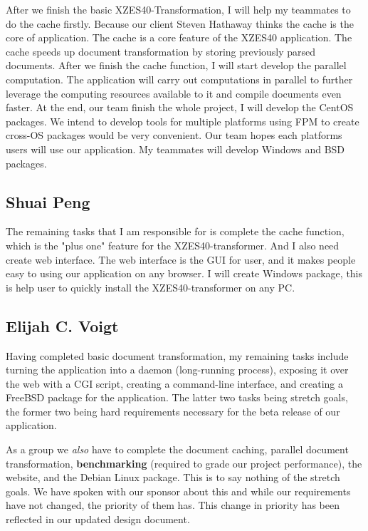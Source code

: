 After we finish the basic XZES40-Transformation, I will help my teammates to do the cache firstly. 
Because our client Steven Hathaway thinks the cache is the core of application. 
The cache is a core feature of the XZES40 application.
The cache speeds up document transformation by storing previously parsed documents. 
After we finish the cache function, I will start develop the parallel computation. 
The application will carry out computations in parallel to further leverage the computing resources available to it and compile documents even faster. 
At the end, our team finish the whole project, I will develop the CentOS packages.
We intend to develop tools for multiple platforms using FPM to create cross-OS packages would be very convenient.  
Our team hopes each platforms users will use our application.
My teammates will develop Windows and BSD packages.

\subsection{Shuai Peng}

The remaining tasks that I am responsible for is complete the cache function, which is the "plus one" feature for the XZES40-transformer. 
And I also need create web interface. 
The web interface is the GUI for user, and it makes people easy to using our application on any browser.
I will create Windows package, this is help user to quickly install the XZES40-transformer on any PC.


\subsection{Elijah C. Voigt}

Having completed basic document transformation, my remaining tasks include turning the application into a daemon (long-running process), exposing it over the web with a CGI script, creating a command-line interface, and creating a FreeBSD package for the application.
The latter two tasks being stretch goals, the former two being hard requirements necessary for the beta release of our application.

As a group we \textit{also} have to complete the document caching, parallel document transformation, \textbf{benchmarking} (required to grade our project performance), the website, and the Debian Linux package.
This is to say nothing of the stretch goals.
We have spoken with our sponsor about this and while our requirements have not changed, the priority of them has.
This change in priority has been reflected in our updated design document.


